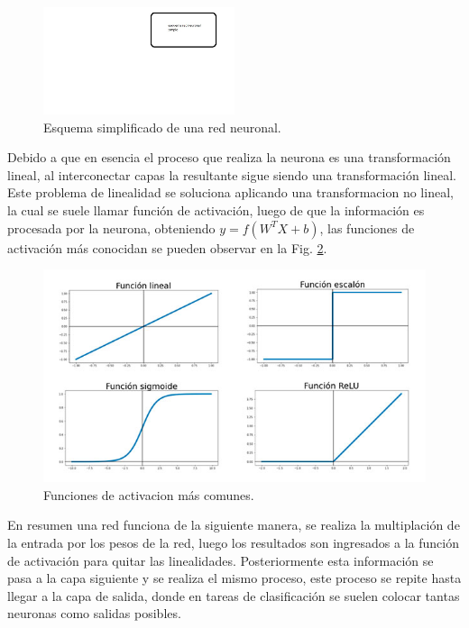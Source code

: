 \begin{figure}[h]
    \centering
    \includegraphics[width=0.5\textwidth]{imgs/Redes-esquema.jpg}
    \caption{Esquema simplificado de una red neuronal.}
    \label{fig:esquema-redes}
\end{figure}

Debido a que en esencia el proceso que realiza la neurona es una transformación lineal, al interconectar capas la resultante sigue siendo una transformación lineal.
Este problema de linealidad se soluciona aplicando una transformacion no lineal, la cual se suele llamar función de activación,
luego de que la información es procesada por la neurona, obteniendo $y= f(W^T X + b)$, las funciones de activación más conocidan se pueden observar en la
Fig. \ref{fig:funciones-activacion}.

\begin{figure}
    \centering
    \includegraphics[width=1\textwidth]{imgs/Funciones-de-activacion.jpg}
    \caption{Funciones de activacion más comunes.}
    \label{fig:funciones-activacion}
\end{figure}

En resumen una red funciona de la siguiente manera, se realiza la multiplación de la entrada por los pesos de la red, luego los resultados son ingresados a la función de activación para quitar las linealidades. Posteriormente esta información se pasa a la capa siguiente y se realiza el mismo proceso, este proceso se repite hasta llegar a la capa de salida, donde en tareas de clasificación se suelen colocar tantas neuronas como salidas posibles.

